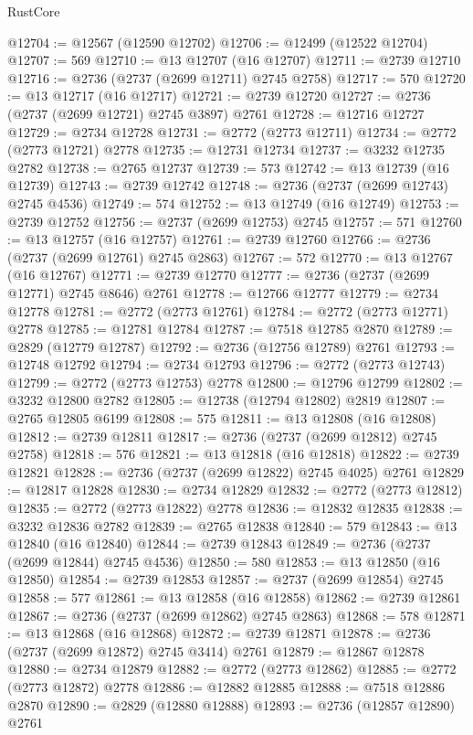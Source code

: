 \begin{lexlean}{RustCore}
\begin{coremodule}
@12704 := @12567 (@12590 @12702)
@12706 := @12499 (@12522 @12704)
@12707 := 569
@12710 := @13 @12707 (@16 @12707)
@12711 := @2739 @12710
@12716 := @2736 (@2737 (@2699 @12711) @2745 @2758)
@12717 := 570
@12720 := @13 @12717 (@16 @12717)
@12721 := @2739 @12720
@12727 := @2736 (@2737 (@2699 @12721) @2745 @3897) @2761
@12728 := @12716 @12727
@12729 := @2734 @12728
@12731 := @2772 (@2773 @12711)
@12734 := @2772 (@2773 @12721) @2778
@12735 := @12731 @12734
@12737 := @3232 @12735 @2782
@12738 := @2765 @12737
@12739 := 573
@12742 := @13 @12739 (@16 @12739)
@12743 := @2739 @12742
@12748 := @2736 (@2737 (@2699 @12743) @2745 @4536)
@12749 := 574
@12752 := @13 @12749 (@16 @12749)
@12753 := @2739 @12752
@12756 := @2737 (@2699 @12753) @2745
@12757 := 571
@12760 := @13 @12757 (@16 @12757)
@12761 := @2739 @12760
@12766 := @2736 (@2737 (@2699 @12761) @2745 @2863)
@12767 := 572
@12770 := @13 @12767 (@16 @12767)
@12771 := @2739 @12770
@12777 := @2736 (@2737 (@2699 @12771) @2745 @8646) @2761
@12778 := @12766 @12777
@12779 := @2734 @12778
@12781 := @2772 (@2773 @12761)
@12784 := @2772 (@2773 @12771) @2778
@12785 := @12781 @12784
@12787 := @7518 @12785 @2870
@12789 := @2829 (@12779 @12787)
@12792 := @2736 (@12756 @12789) @2761
@12793 := @12748 @12792
@12794 := @2734 @12793
@12796 := @2772 (@2773 @12743)
@12799 := @2772 (@2773 @12753) @2778
@12800 := @12796 @12799
@12802 := @3232 @12800 @2782
@12805 := @12738 (@12794 @12802) @2819
@12807 := @2765 @12805 @6199
@12808 := 575
@12811 := @13 @12808 (@16 @12808)
@12812 := @2739 @12811
@12817 := @2736 (@2737 (@2699 @12812) @2745 @2758)
@12818 := 576
@12821 := @13 @12818 (@16 @12818)
@12822 := @2739 @12821
@12828 := @2736 (@2737 (@2699 @12822) @2745 @4025) @2761
@12829 := @12817 @12828
@12830 := @2734 @12829
@12832 := @2772 (@2773 @12812)
@12835 := @2772 (@2773 @12822) @2778
@12836 := @12832 @12835
@12838 := @3232 @12836 @2782
@12839 := @2765 @12838
@12840 := 579
@12843 := @13 @12840 (@16 @12840)
@12844 := @2739 @12843
@12849 := @2736 (@2737 (@2699 @12844) @2745 @4536)
@12850 := 580
@12853 := @13 @12850 (@16 @12850)
@12854 := @2739 @12853
@12857 := @2737 (@2699 @12854) @2745
@12858 := 577
@12861 := @13 @12858 (@16 @12858)
@12862 := @2739 @12861
@12867 := @2736 (@2737 (@2699 @12862) @2745 @2863)
@12868 := 578
@12871 := @13 @12868 (@16 @12868)
@12872 := @2739 @12871
@12878 := @2736 (@2737 (@2699 @12872) @2745 @3414) @2761
@12879 := @12867 @12878
@12880 := @2734 @12879
@12882 := @2772 (@2773 @12862)
@12885 := @2772 (@2773 @12872) @2778
@12886 := @12882 @12885
@12888 := @7518 @12886 @2870
@12890 := @2829 (@12880 @12888)
@12893 := @2736 (@12857 @12890) @2761

\end{coremodule}
\end{lexlean}

